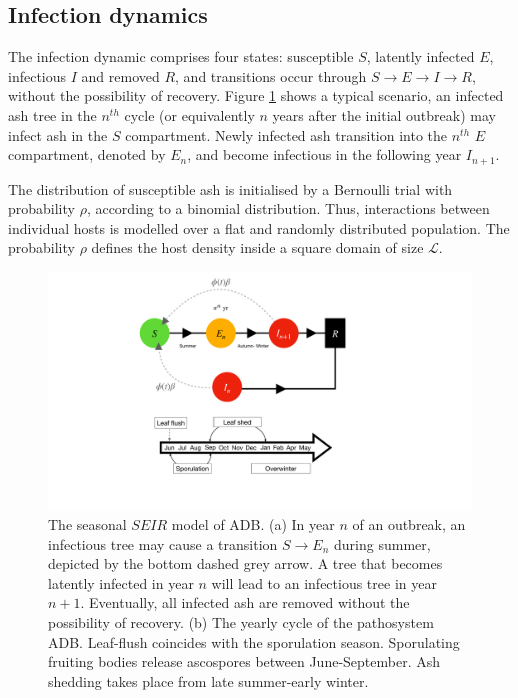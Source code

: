 \subsection{Infection dynamics}
\label{sec:infection-dynamics}

The infection dynamic comprises four states: susceptible $S$, latently infected $E$, infectious $I$ and removed $R$, and transitions occur through $S\rightarrow E \rightarrow I \rightarrow R$, without the possibility of recovery. Figure \ref{fig:SEIR-transitions} shows a typical scenario, an infected ash tree in the $n^{th}$ cycle (or equivalently $n$ years after the initial outbreak) may infect ash in the $S$ compartment. 
Newly infected ash transition into the $n^{th}$ $E$ compartment, denoted by $E_n$, and become infectious in the following year $I_{n+1}$.

The distribution of susceptible ash is initialised by a Bernoulli trial with probability $\rho$, according to a binomial distribution.
Thus, interactions between individual hosts is modelled over a flat and randomly distributed population.
The probability $\rho$ defines the host density inside a square domain of size $\mathcal{L}$. 

\begin{figure}
    \centering
    \includegraphics[scale=0.40]{chapter6/figures/fig1-seir-transitions.pdf}
    \caption{The seasonal $SEIR$ model of ADB. (a) In year $n$ of an outbreak, an infectious tree may cause a transition $S\rightarrow E_n$ during summer, depicted by the bottom dashed grey arrow. A tree that becomes latently infected in year $n$ will lead to an infectious tree in year $n+1$. Eventually, all infected ash are removed without the possibility of recovery. (b) The yearly cycle of the pathosystem ADB. Leaf-flush coincides with the sporulation season. Sporulating fruiting bodies release ascospores between June-September. Ash shedding takes place from late summer-early winter. }
    \label{fig:SEIR-transitions}
\end{figure}

